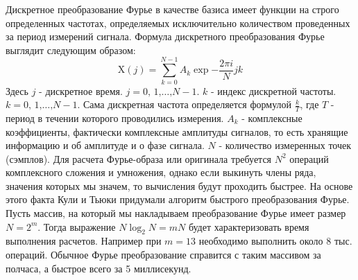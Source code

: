 Дискретное преобразование Фурье в качестве базиса имеет функции на строго определенных частотах, определяемых исключительно количеством проведенных за период измерений сигнала.
Формула дискретного преобразования Фурье выглядит следующим образом:
\begin{equation}
    \mathrm{X}(j) = \sum \limits_{k = 0}^{N-1}A_k\exp{-\frac{2\pi i }{N}jk}
\end{equation}
Здесь $j$ - дискретное время. $j = 0\text{, }1\text{,}\ldots\text{,}N-1$.
$k$ - индекс дискретной частоты. $k = 0\text{, }1\text{,}\ldots\text{,}N-1$. Сама дискретная частота определяется формулой $\frac{k}{T}$, где $T$ - период в течении которого проводились измерения. $A_k$ - комплексные коэффициенты, фактически комплексные амплитуды сигналов, то есть хранящие информацию и об амплитуде и о фазе сигнала. $N$ - количество измеренных точек (сэмплов). Для расчета Фурье-образа или оригинала требуется $N^2$ операций комплексного сложения и умножения, однако если выкинуть члены ряда, значения которых мы значем, то вычисления будут проходить быстрее. На основе этого факта Кули и Тьюки придумали алгоритм быстрого преобразования Фурье. Пусть массив, на который мы накладываем преобразование Фурье имеет размер $N = 2^m$. Тогда выражение $N\log_2 N = mN$ будет характеризовать время выполнения расчетов. Например при $m =13$ необходимо выполнить около 8 тыс. операций. Обычное Фурье преобразование справится с таким массивом за полчаса, а быстрое всего за 5 миллисекунд. 